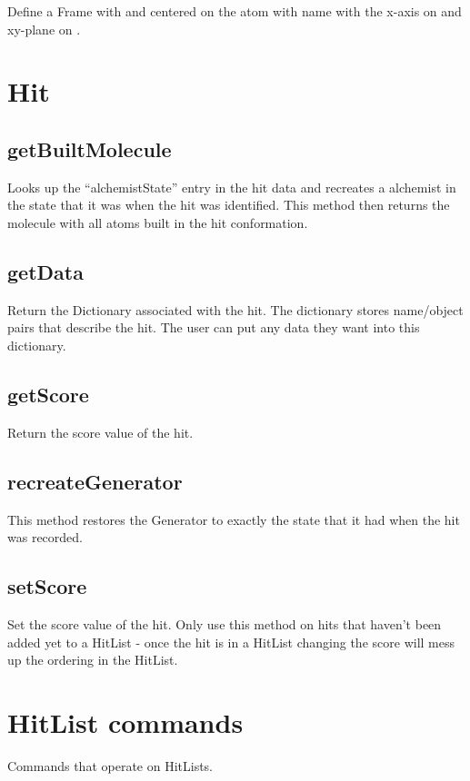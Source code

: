 \begin{itemize}
Define a Frame with  and centered on the atom with name 
with the x-axis on  and xy-plane on .


\section{Hit}
\subsection{getBuiltMolecule}

  Looks up the ``alchemistState'' entry in the hit data and recreates a alchemist in the state that it was when the hit was identified. This method then returns the molecule with all atoms built in the hit conformation.

\subsection{getData}

  Return the Dictionary associated with the hit. The dictionary stores name/object pairs that describe the hit. The user can put any data they want into this dictionary.

\subsection{getScore}

  Return the score value of the hit.

\subsection{recreateGenerator}

  This method restores the Generator to exactly the state that it had when the hit was recorded.

\subsection{setScore}

  Set the score value of the hit.  Only use this method on hits that haven't been added yet to a HitList - once the hit is in a HitList changing the score will mess up the ordering in the HitList.

\section{HitList commands}
  Commands that operate on HitLists.


\end{itemize}
